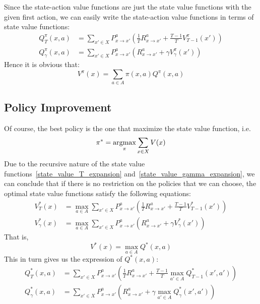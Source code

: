 Since the state-action value functions are just the state value functions with the given first action, we can 
easily write the state-action value functions in terms of state value functions:
\begin{align}
    Q^\pi_T(x, a) &= \sum_{x' \in X} P_{x \rightarrow x'}^a\left(\frac{1}{T}R_{x \rightarrow x'}^a +
    \frac{T-1}{T}V^\pi_{T-1}(x')\right)\label{state-action_value_T_expansion}\\
    Q^\pi_\gamma(x, a) &= \sum_{x' \in X} P_{x \rightarrow x'}^a\left(R_{x \rightarrow x'}^a + \gamma 
    V^\pi_\gamma(x')\right)\label{state-action_value_gamma_expansion}
\end{align}
Hence it is obvious that:
\begin{equation}\label{relation_V_Q}
V^\pi(x) = \sum_{a \in A}\pi(x, a)Q^\pi(x, a)
\end{equation}


\subsection{Policy Improvement}
Of course, the best policy is the one that maximize the state value function, i.e.
$$\pi^* = \operatorname*{argmax}_\pi \sum_{x \in X}V(x)$$
Due to the recursive nature of the state value functions~\eqref{state_value_T_expansion}
and~\eqref{state_value_gamma_expansion}, we can conclude that if there is no restriction on the policies that 
we can choose, the optimal state value functions satisfy the following equations:
\begin{align}
    V^*_T(x) &= \max_{a \in A} \sum_{x' \in X}P_{x \rightarrow x'}^a\left(\frac{1}{T}R_{x \rightarrow x'}^a +
    \frac{T-1}{T}V^*_{T-1}(x')\right)\\
    V^*_\gamma(x) &= \max_{a \in A} \sum_{x' \in X}P_{x \rightarrow x'}^a\left(R_{x \rightarrow x'}^a + \gamma
    V^*_\gamma(x')\right)
\end{align}
That is,
\begin{equation}\label{relation_optimal_V_Q}
    V^*(x) = \max_{a \in A}Q^*(x, a)
\end{equation}
This in turn gives us the expression of $Q^*(x, a)$:
\begin{align}
    Q^*_T(x, a) &= \sum_{x' \in X} P_{x \rightarrow x'}^a\left(\frac{1}{T}R_{x \rightarrow x'}^a +
    \frac{T-1}{T}\max_{a' \in A}Q^*_{T-1}(x',a')\right)\\
    Q^*_\gamma(x, a) &= \sum_{x' \in X} P_{x \rightarrow x'}^a\left(R_{x \rightarrow x'}^a + \gamma 
    \max_{a' \in A}Q^*_\gamma(x', a')\right)
\end{align}


